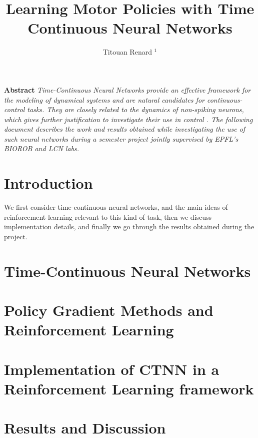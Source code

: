 \documentclass{two-col-epfl}
\begin{document}

\title{Learning Motor Policies with Time Continuous Neural Networks}

\author{Titouan Renard $^1$}

\address{}
\maketitle








\textbf{Abstract}
\textit{Time-Continuous Neural Networks provide an effective framework for the modeling of dynamical systems \cite{Chen2018NeuralOD} and are natural candidates for continuous-control tasks. They are closely related to the dynamics of non-spiking neurons, which gives further justification to investigate their use in control \cite{Lechner2020NeuralCP}. The following document describes the work and results obtained while investigating the use of such neural networks during a semester project jointly supervised by EPFL's BIOROB and LCN labs.}

\section*{Introduction}

We first consider time-continuous neural networks, and the main ideas of reinforcement learning relevant to this kind of task, then we discuss implementation details, and finally we go through the results obtained during the project.

\section{Time-Continuous Neural Networks}


\section{Policy Gradient Methods and Reinforcement Learning}


\section{Implementation of CTNN in a Reinforcement Learning framework}


\section{Results and Discussion}



\printbibliography
\end{document}
